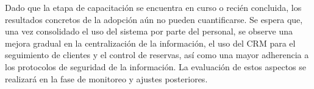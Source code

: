 \begin{indentedsubsection}
Dado que la etapa de capacitación se encuentra en curso o recién concluida, los resultados concretos de la adopción aún no pueden cuantificarse. Se espera que, una vez consolidado el uso del sistema por parte del personal, se observe una mejora gradual en la centralización de la información, el uso del CRM para el seguimiento de clientes y el control de reservas, así como una mayor adherencia a los protocolos de seguridad de la información. La evaluación de estos aspectos se realizará en la fase de monitoreo y ajustes posteriores.

\end{indentedsubsection}

